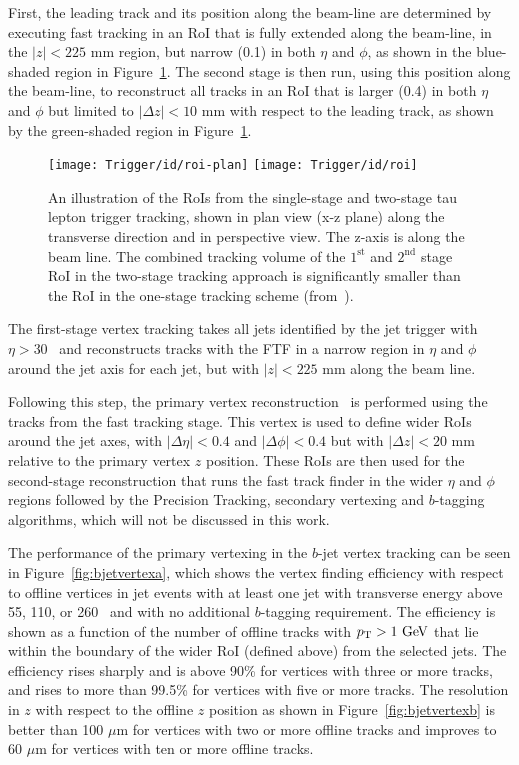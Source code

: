 				First, the leading track and its position along the beam-line are determined by executing fast tracking in an \ac{RoI} that is fully extended along the beam-line, in the $|z|<225$ mm region, but narrow (0.1) in both $\eta$ and $\phi$, as shown in the blue-shaded region in Figure~\ref{fig:idroi}. The second stage is then run, using this position along the beam-line, to reconstruct all tracks in an \ac{RoI} that is larger (0.4) in both $\eta$ and $\phi$ but limited to $|\Delta z|<10$ mm with respect to the leading track, as shown by the green-shaded region in Figure~\ref{fig:idroi}.

				\begin{figure}[!htb]
					\centering
					\texttt{[image: Trigger/id/roi-plan]}
					\texttt{[image: Trigger/id/roi]}
					\caption{An illustration of the \ac{RoI}s from the single-stage and two-stage tau lepton trigger tracking, shown in plan view (x-z plane) along the transverse direction and in perspective view. The z-axis is along the beam line. The combined tracking volume of the $1^{\mathrm{st}}$ and $2^{\mathrm{nd}}$ stage \ac{RoI} in the two-stage tracking approach is significantly smaller than the \ac{RoI} in the one-stage tracking scheme (from~\cite{ATLASTrigger2015}).}
					\label{fig:idroi}
				\end{figure}

				The first-stage vertex tracking takes all jets identified by the jet trigger with $\eta > 30$ \GeV\ and reconstructs tracks with the \ac{FTF} in a narrow region in $\eta$ and $\phi$ around the jet axis for each jet, but with $|z|<225$ mm along the beam line.
				
				Following this step, the primary vertex reconstruction~\cite{ATLAS-CONF-2010-069} is performed using the tracks from the fast tracking stage. This vertex is used to define wider \ac{RoI}s around
				the jet axes, with $|\Delta\eta|<0.4$ and $|\Delta\phi|<0.4$ but with $|\Delta z|<20$ mm relative to the primary vertex $z$ position. These \ac{RoI}s are then used for the second-stage 
				reconstruction that runs the fast track finder in the wider $\eta$ and $\phi$ regions followed by the Precision Tracking, secondary vertexing and $b$-tagging algorithms, which will not be discussed in this work.

				The performance of the primary vertexing in the $b$-jet vertex tracking can be seen in Figure~\ref{fig:bjetvertexa}, which shows the vertex finding efficiency with respect to 
				offline vertices in jet events with at least one jet with transverse energy above 55, 110, or 260 \GeV\ and with no additional $b$-tagging requirement. The efficiency is shown 
				as a function of the number of offline tracks with $\pt>1 \GeV$ that lie within the boundary of the wider \ac{RoI} (defined above) from the selected jets. The efficiency rises sharply and 
				is above 90\% for vertices with three or more tracks, and rises to more than 99.5\% for vertices with five or more tracks. The resolution in $z$ with respect to the offline $z$ position as shown in Figure~\ref{fig:bjetvertexb} is better than 100 $\mu$m for vertices with two or more offline tracks and improves to 60 $\mu$m for vertices with ten or more offline tracks.

